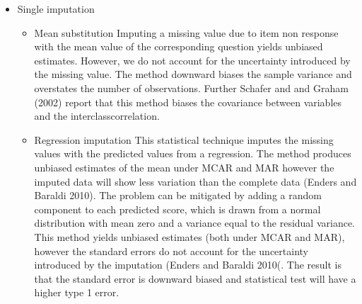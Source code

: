  \begin{itemize} 
\item Single imputation
\begin{itemize}
\item Mean substitution
Imputing a missing value due to item non response with the mean value of the corresponding question yields unbiased estimates. However, we do not account for the uncertainty introduced by the missing value. The method downward biases the sample variance and  overstates the number of observations. Further Schafer and and Graham (2002) report that this method biases the covariance between variables and the interclasscorrelation. 
\item  Regression imputation
This statistical technique imputes the missing values with the predicted values from a regression. The method produces unbiased estimates of the mean under MCAR and MAR however the imputed data will show less variation than the complete data (Enders and Baraldi 2010). The problem can be mitigated by adding a random component to each predicted score, which is drawn from a normal distribution with mean zero and a variance equal to the residual variance. This method yields unbiased estimates (both under MCAR and MAR), however the standard errors do not account for the uncertainty introduced by the imputation (Enders and Baraldi 2010(. The result is that the standard error is downward biased and statistical test will have a higher type 1 error. 
 \end{itemize}  

\end{itemize}  
